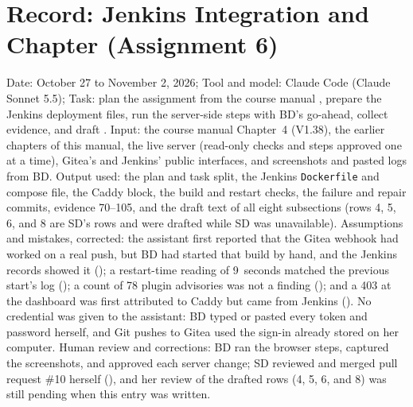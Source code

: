 \section{Record: Jenkins Integration and Chapter (Assignment 6)}
Date: October 27 to November 2, 2026; Tool and model: Claude Code (Claude
Sonnet 5.5); Task: plan the assignment from the course manual
\cite{DosManual}, prepare the Jenkins deployment files, run the server-side
steps with BD's go-ahead, collect evidence, and draft .
Input: the course manual Chapter~4 (V1.38), the earlier chapters of this manual,
the live server (read-only checks and steps approved one at a time), Gitea's and
Jenkins' public interfaces, and screenshots and pasted logs from BD. Output used:
the plan and task split, the Jenkins \texttt{Dockerfile} and compose file, the
Caddy block, the build and restart checks, the failure and repair commits, evidence
70--105, and the draft text of all eight subsections (rows 4, 5, 6, and 8 are
SD's rows and were drafted while SD was unavailable). Assumptions and mistakes,
corrected: the assistant first reported that the Gitea webhook had worked on a real
push, but BD had started that build by hand, and the Jenkins records showed it
(); a restart-time reading of 9~seconds matched the previous start's log
(); a count of 78 plugin advisories was not a finding (); and a
403 at the dashboard was first attributed to Caddy but came from Jenkins ().
No credential was given to the assistant: BD typed or pasted every token and password
herself, and Git pushes to Gitea used the sign-in already stored on her computer.
Human review and corrections: BD ran the browser steps, captured the screenshots,
and approved each server change; SD reviewed and merged pull request \#10 herself
(), and her review of the drafted rows (4, 5, 6, and 8) was still
pending when this entry was written.

